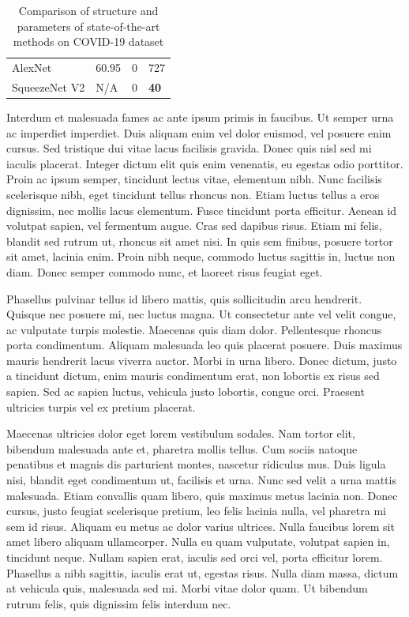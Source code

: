 \begin{table}[h]
\begin{tabular}{@{}llll@{}}
AlexNet       & 60.95                                                                           & 0                                                                                 & 727                                                                           \\
SqueezeNet V2 & {\color[HTML]{000000} N/A}                                                      & 0                                                                                 & {\color[HTML]{CB0000} \textbf{40}}                                            \\ \bottomrule
\end{tabular}
\caption{Comparison of structure and parameters of state-of-the-art methods on COVID-19 dataset}
\end{table}

Interdum et malesuada fames ac ante ipsum primis in faucibus. Ut semper urna ac imperdiet imperdiet. Duis aliquam enim vel dolor euismod, vel posuere enim cursus. Sed tristique dui vitae lacus facilisis gravida. Donec quis nisl sed mi iaculis placerat. Integer dictum elit quis enim venenatis, eu egestas odio porttitor. Proin ac ipsum semper, tincidunt lectus vitae, elementum nibh. Nunc facilisis scelerisque nibh, eget tincidunt tellus rhoncus non. Etiam luctus tellus a eros dignissim, nec mollis lacus elementum. Fusce tincidunt porta efficitur. Aenean id volutpat sapien, vel fermentum augue. Cras sed dapibus risus. Etiam mi felis, blandit sed rutrum ut, rhoncus sit amet nisi. In quis sem finibus, posuere tortor sit amet, lacinia enim. Proin nibh neque, commodo luctus sagittis in, luctus non diam. Donec semper commodo nunc, et laoreet risus feugiat eget.

Phasellus pulvinar tellus id libero mattis, quis sollicitudin arcu hendrerit. Quisque nec posuere mi, nec luctus magna. Ut consectetur ante vel velit congue, ac vulputate turpis molestie. Maecenas quis diam dolor. Pellentesque rhoncus porta condimentum. Aliquam malesuada leo quis placerat posuere. Duis maximus mauris hendrerit lacus viverra auctor. Morbi in urna libero. Donec dictum, justo a tincidunt dictum, enim mauris condimentum erat, non lobortis ex risus sed sapien. Sed ac sapien luctus, vehicula justo lobortis, congue orci. Praesent ultricies turpis vel ex pretium placerat.

Maecenas ultricies dolor eget lorem vestibulum sodales. Nam tortor elit, bibendum malesuada ante et, pharetra mollis tellus. Cum sociis natoque penatibus et magnis dis parturient montes, nascetur ridiculus mus. Duis ligula nisi, blandit eget condimentum ut, facilisis et urna. Nunc sed velit a urna mattis malesuada. Etiam convallis quam libero, quis maximus metus lacinia non. Donec cursus, justo feugiat scelerisque pretium, leo felis lacinia nulla, vel pharetra mi sem id risus. Aliquam eu metus ac dolor varius ultrices. Nulla faucibus lorem sit amet libero aliquam ullamcorper. Nulla eu quam vulputate, volutpat sapien in, tincidunt neque. Nullam sapien erat, iaculis sed orci vel, porta efficitur lorem. Phasellus a nibh sagittis, iaculis erat ut, egestas risus. Nulla diam massa, dictum at vehicula quis, malesuada sed mi. Morbi vitae dolor quam. Ut bibendum rutrum felis, quis dignissim felis interdum nec.


